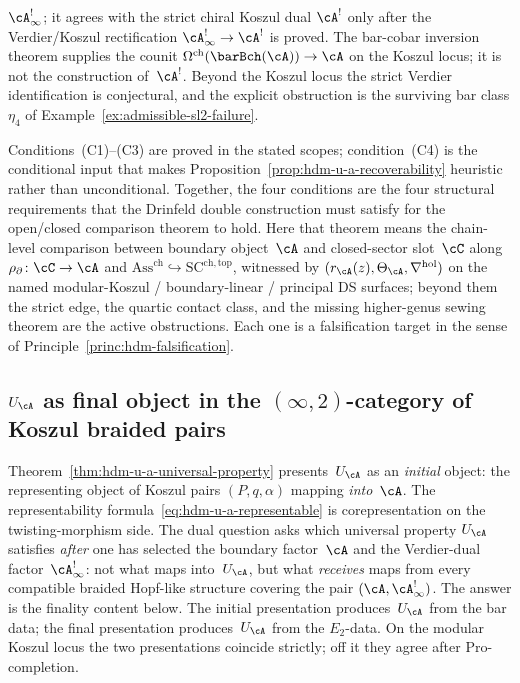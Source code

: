 \begin{remark}
\begin{enumerate}[label=\textup{(C\arabic*)}]
 $\cA^{!}_\infty$; it agrees with the strict chiral Koszul dual
 $\cA^!$ only after the Verdier/Koszul rectification
 $\cA^{!}_\infty \to \cA^!$ is proved. The bar-cobar inversion
 theorem supplies the counit
 $\Omega^{\mathrm{ch}}(\barBch(\cA))\to\cA$ on the Koszul locus; it
 is not the construction of~$\cA^!$. Beyond the Koszul locus the
 strict Verdier identification is conjectural, and the explicit
 obstruction is the surviving bar class $\eta_4$ of
 Example~\ref{ex:admissible-sl2-failure}.
\end{enumerate}
Conditions~(C1)--(C3) are proved in the stated scopes; condition~(C4)
is the conditional input that makes
Proposition~\ref{prop:hdm-u-a-recoverability} heuristic rather than
unconditional. Together, the four conditions are the four
structural requirements that the Drinfeld double construction must
satisfy for the open/closed comparison theorem to hold. Here that
theorem means the chain-level comparison between boundary object~$\cA$
and closed-sector slot~$\cC$ along
$\rho_{\partial}\colon\cC\to\cA$ and
$\mathrm{Ass}^{\mathrm{ch}}\hookrightarrow\mathrm{SC}^{\mathrm{ch,top}}$,
witnessed by $(r_\cA(z),\Theta_\cA,\nabla^{\mathrm{hol}})$ on the
named modular-Koszul / boundary-linear / principal DS surfaces; beyond
them the strict edge, the quartic contact class, and the missing
higher-genus sewing theorem are the active obstructions. Each one is a
falsification target in the sense of
Principle~\ref{princ:hdm-falsification}.
\end{remark}

\subsection{$U_\cA$ as final object in the $(\infty,2)$-category of
Koszul braided pairs}
\label{subsec:hdm-u-a-final-object}

Theorem~\ref{thm:hdm-u-a-universal-property} presents~$U_\cA$ as an
\emph{initial} object: the representing object of Koszul pairs
$(P,q,\alpha)$ mapping \emph{into}~$\cA$. The representability
formula~\eqref{eq:hdm-u-a-representable} is corepresentation on the
twisting-morphism side. The dual question asks which universal property
$U_\cA$ satisfies \emph{after} one has selected the boundary
factor~$\cA$ and the Verdier-dual factor~$\cA^!_\infty$: not what maps
into~$U_\cA$, but what \emph{receives} maps from every compatible
braided Hopf-like structure covering the pair
$(\cA,\cA^!_\infty)$. The answer is the finality content below. The
initial presentation produces~$U_\cA$ from the bar data; the final
presentation produces~$U_\cA$ from the $E_2$-data. On the modular Koszul locus the
two presentations coincide strictly; off it they agree after
$\mathrm{Pro}$-completion.

